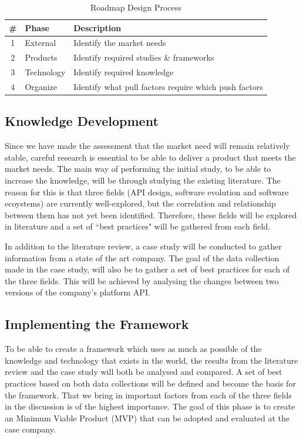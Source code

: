 \documentclass{article}
\begin{document}
\begin{table}[ht]
\centering
\begin{tabular}[ht]{|c|l|l|}
\hline
\textbf{\#} & \textbf{Phase} & \textbf{Description} \\
\hline
1 & External & Identify the market needs \\
\hline
2 & Products & Identify required studies \& frameworks \\
\hline
3 & Technology & Identify required knowledge \\
\hline
4 & Organize & Identify what pull factors require which push factors \\
\hline
\end{tabular}
\caption{Roadmap Design Process}
\label{tab:proc}
\end{table}

\subsection{Knowledge Development}
Since we have made the assessment that the market need will remain relatively stable, careful research is essential to be able to deliver a product that meets the market needs. The main way of performing the initial study, to be able to increase the knowledge, will be through studying the existing literature. The reason for this is that three fields (API design, software evolution and software ecoystems) are currently well-explored, but the correlation and relationship between them has not yet been identified. Therefore, these fields will be explored in literature and a set of ``best practices" will be gathered from each field. 

In addition to the literature review, a case study will be conducted to gather information from a state of the art company. The goal of the data collection made in the case study, will also be to gather a set of best practices for each of the three fields. This will be achieved by analysing the changes between two versions of the company's platform API. 


\subsection{Implementing the Framework}
To be able to create a framework which uses as much as possible of the knowledge and technology that exists in the world, the results from the literature review and the case study will both be analysed and compared. A set of best practices based on both data collections will be defined and become the basis for the framework. That we bring in important factors from each of the three fields in the discussion is of the highest importance. The goal of this phase is to create an Minimum Viable Product (MVP) that can be adopted and evaluated at the case company. 
\end{document}
